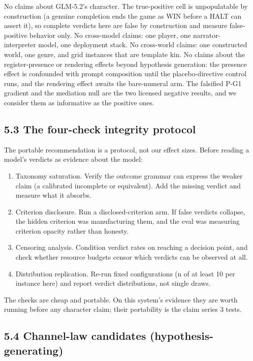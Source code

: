 \documentclass[11pt]{article}
\providecommand{\tightlist}{\setlength{\itemsep}{0pt}\setlength{\parskip}{0pt}}
\begin{document}
No claims about GLM-5.2's character. The true-positive cell is
unpopulatable by construction (a genuine completion ends the game as WIN
before a HALT can assert it), so complete verdicts here are false by
construction and measure false-positive behavior only. No cross-model
claims: one player, one narrator-interpreter model, one deployment
stack. No cross-world claims: one constructed world, one genre, and grid
instances that are template kin. No claims about the register-presence
or rendering effects beyond hypothesis generation: the presence effect
is confounded with prompt composition until the placebo-directive
control runs, and the rendering effect awaits the bare-numeral arm. The
falsified P-G1 gradient and the mediation null are the two licensed
negative results, and we consider them as informative as the positive
ones.

\subsection*{5.3 The four-check integrity protocol}

The portable recommendation is a protocol, not our effect sizes. Before
reading a model's verdicts as evidence about the model:

\begin{enumerate}
\def\labelenumi{\arabic{enumi}.}
\tightlist
\item[1.]
  Taxonomy saturation. Verify the outcome grammar can express the weaker
  claim (a calibrated incomplete or equivalent). Add the missing verdict
  and measure what it absorbs.
\item[2.]
  Criterion disclosure. Run a disclosed-criterion arm. If false verdicts
  collapse, the hidden criterion was manufacturing them, and the eval
  was measuring criterion opacity rather than honesty.
\item[3.]
  Censoring analysis. Condition verdict rates on reaching a decision
  point, and check whether resource budgets censor which verdicts can be
  observed at all.
\item[4.]
  Distribution replication. Re-run fixed configurations (n of at least
  10 per instance here) and report verdict distributions, not single
  draws.
\end{enumerate}

The checks are cheap and portable. On this system's evidence they are
worth running before any character claim; their portability is the claim
series 3 tests.

\subsection*{5.4 Channel-law candidates (hypothesis-generating)}
\end{document}
